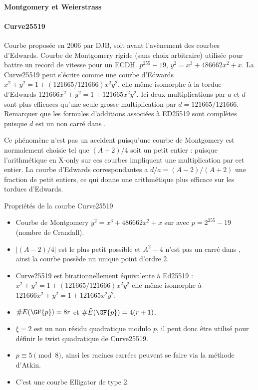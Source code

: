 \paragraph{Montgomery et Weierstrass}


\paragraph{Curve25519}
Courbe proposée en 2006 par DJB, soit avant l'avènement des courbes d'Edwards. Courbe de Montgomery rigide (sans choix arbitraire) utilisée pour battre un record de vitesse pour un ECDH. 
$p^{255} - 19$, $y^2 = x^3 + 486662x^2 + x$. La Curve25519 peut s'écrire comme une courbe d'Edwards $x^2 + y^2 = 1 + (121665/121666)x^2y^2$, elle-même isomorphe à la tordue d'Edwards $121666x^2 + y^2 = 1 + 121665x^2y^2$. Ici deux multiplications par $a$ et $d$ sont plus efficaces qu'une seule grosse multiplication par $d = 121665/121666$. Remarquer que les formules d'additions associées à ED25519 sont complètes puisque $d$ est un non carré dans . 

Ce phénomène n'est pas un accident puisqu'une courbe de Montgomery est normalement choisie tel que $(A+2)/4$ soit un petit entier : puisque l'arithmétique en X-only sur ces courbes impliquent une multiplication par cet entier. La courbe d'Edwards correspondantes a $d/a = (A - 2)/(A + 2)$ une fraction de petit entiers, ce qui donne une arithmétique plus efficace sur les tordues d'Edwards. 

Propriétés de la courbe Curve25519
\begin{itemize}
    \item Courbe de Montgomery $y^2 = x^3 + 486662x^2 + x$ sur  avec $p = 2^{255} - 19$ (nombre de Crandall).
    \item $|(A-2)/4|$ est le plus petit possible et $A^2 - 4$ n'est pas un carré dans , ainsi la courbe possède un unique point d'ordre $2$.
    \item Curve25519 est birationnellement équivalente à Ed25519 : $x^2 + y^2 = 1 + (121665/121666)x^2y^2$ elle même isomorphe à $121666x^2 + y^2 = 1 + 121665x^2y^2$. 
    \item $\#E(\GF{p}) = 8r$ et $\#\tilde{E}(\GF{p}) = 4(r+1)$. 
    \item $\xi = 2$  est un non résidu quadratique modulo $p$, il peut donc être utilisé pour définir le twist quadratique de Curve25519.
    \item $p \equiv 5 \pmod 8$, ainsi les racines carrées peuvent se faire via la méthode d'Atkin.
    \item C'est une courbe Elligator de type 2.
\end{itemize}

